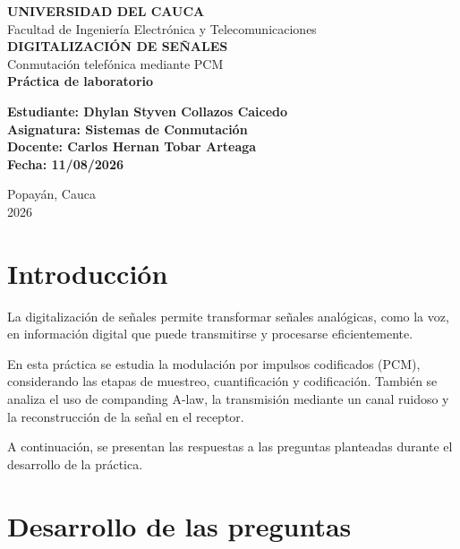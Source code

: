 \documentclass[12pt,a4paper]{article}
\begin{document}
\begin{titlepage}
    \centering
    
    \vspace*{1.5cm}
    
    {\Large \textbf{UNIVERSIDAD DEL CAUCA}}\\[0.5cm]
    {\large Facultad de Ingeniería Electrónica y Telecomunicaciones}\\[2cm]
    
    {\Huge \textbf{DIGITALIZACIÓN DE SEÑALES}}\\[0.3cm]
    {\Large Conmutación telefónica mediante PCM}\\[2cm]
    
    \textbf{Práctica de laboratorio}\\[1.5cm]
    
    \begin{center}
        \textbf{Estudiante: Dhylan Styven Collazos Caicedo}\\[0.5cm]
        \textbf{Asignatura: Sistemas de Conmutación}\\[0.5cm]
        \textbf{Docente: Carlos Hernan Tobar Arteaga}\\[0.5cm]
        \textbf{Fecha: 11/08/2026}
    \end{center}
    
    \vfill
    
    {\large Popayán, Cauca}\\
    {\large 2026}
\end{titlepage}

\section{Introducción}

La digitalización de señales permite transformar señales
analógicas, como la voz, en información digital que puede
transmitirse y procesarse eficientemente.

En esta práctica se estudia la modulación por impulsos
codificados (PCM), considerando las etapas de muestreo,
cuantificación y codificación. También se analiza el uso
de companding A-law, la transmisión mediante un canal
ruidoso y la reconstrucción de la señal en el receptor.

A continuación, se presentan las respuestas a las preguntas
planteadas durante el desarrollo de la práctica.

\section{Desarrollo de las preguntas}
\end{document}
